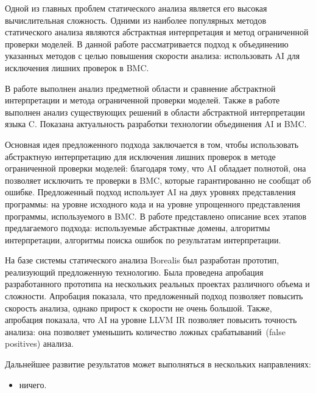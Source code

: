 \conclusion
Одной из главных проблем статического анализа является его высокая 
вычислительная сложность. Одними из наиболее популярных методов статического
анализа являются абстрактная интерпретация и метод ограниченной проверки моделей.
В данной работе рассматривается подход к объединению указанных методов с целью
повышения скорости анализа: использовать AI для исключения лишних проверок в BMC.

В работе выполнен анализ предметной области и сравнение абстрактной интерпретации
и метода ограниченной проверки моделей. Также в работе выполнен анализ 
существующих решений в области абстрактной интерпретации языка C. Показана 
актуальность разработки технологии объединения AI и BMC.

Основная идея предложенного подхода заключается в том, чтобы использовать 
абстрактную интерпретацию для исключения лишних проверок в методе ограниченной 
проверки моделей: благодаря тому, что AI обладает полнотой, она позволяет 
исключить те проверки в BMC, которые гарантированно не сообщат об ошибке. 
Предложенный подход использует AI на двух уровнях представления программы:
на уровне исходного кода и на уровне упрощенного представления программы, 
используемого в BMC. В работе представлено описание всех этапов предлагаемого
подхода: используемые абстрактные домены, алгоритмы интерпретации, алгоритмы
поиска ошибок по результатам интерпретации.

На базе системы статического анализа Borealis был разработан прототип, 
реализующий предложенную технологию. Была проведена апробация разработанного
прототипа на нескольких реальных проектах различного объема и сложности. 
Апробация показала, что предложенный подход позволяет повысить скорость анализа,
однако прирост к скорости не очень большой. Также, апробация показала, что
AI на уровне LLVM IR позволяет повысить точность анализа: она позволяет уменьшить
количество ложных срабатываний~(false positives) анализа.

Дальнейшее развитие результатов может выполняться в нескольких направлениях:
\begin{itemize}
\item ничего.
\end{itemize}